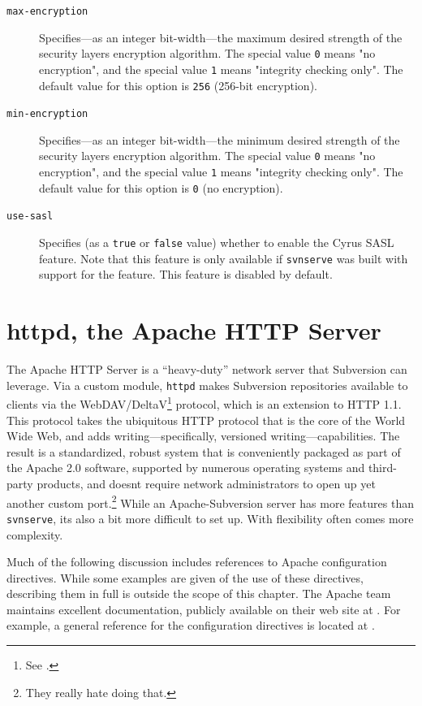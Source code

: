 \begin{description}
\item[\texttt{max-encryption}]
Specifies---as an integer bit-width---the maximum desired strength of
the security layer\textquotesingle s encryption algorithm. The special
value \texttt{0} means "no encryption", and the special value \texttt{1}
means "integrity checking only". The default value for this option is
\texttt{256} (256-bit encryption).
\item[\texttt{min-encryption}]
Specifies---as an integer bit-width---the minimum desired strength of
the security layer\textquotesingle s encryption algorithm. The special
value \texttt{0} means "no encryption", and the special value \texttt{1}
means "integrity checking only". The default value for this option is
\texttt{0} (no encryption).
\item[\texttt{use-sasl}]
Specifies (as a \texttt{true} or \texttt{false} value) whether to enable
the Cyrus SASL feature. Note that this feature is only available if
\texttt{svnserve} was built with support for the feature. This feature
is disabled by default.
\end{description}

\section{httpd, the Apache HTTP Server}\label{svn.serverconfig.httpd}

The Apache HTTP Server is a ``heavy-duty'' network server that
Subversion can leverage. Via a custom module, \texttt{httpd} makes
Subversion repositories available to clients via the
WebDAV/DeltaV\footnote{See \href{http://www.webdav.org/}{}.} protocol,
which is an extension to HTTP 1.1. This protocol takes the ubiquitous
HTTP protocol that is the core of the World Wide Web, and adds
writing---specifically, versioned writing---capabilities. The result is
a standardized, robust system that is conveniently packaged as part of
the Apache 2.0 software, supported by numerous operating systems and
third-party products, and doesn\textquotesingle t require network
administrators to open up yet another custom port.\footnote{They really
  hate doing that.} While an Apache-Subversion server has more features
than \texttt{svnserve}, it\textquotesingle s also a bit more difficult
to set up. With flexibility often comes more complexity.

Much of the following discussion includes references to Apache
configuration directives. While some examples are given of the use of
these directives, describing them in full is outside the scope of this
chapter. The Apache team maintains excellent documentation, publicly
available on their web site at \href{https://httpd.apache.org}{}. For
example, a general reference for the configuration directives is located
at \href{https://httpd.apache.org/docs/current/mod/directives.html}{}.

